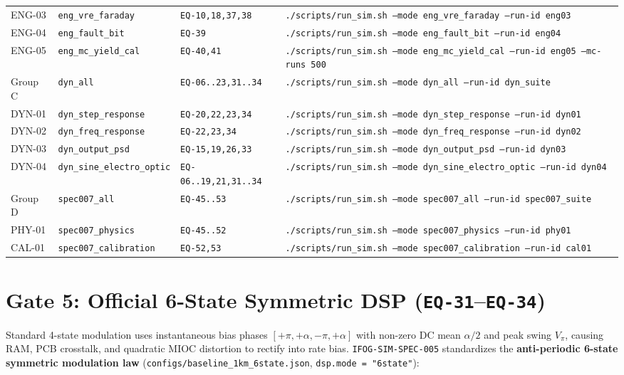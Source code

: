 \documentclass[11pt,a4paper]{article}
\begin{document}
\begin{tabularx}{\textwidth}{@{}l l l X@{}}
ENG-03 & \texttt{eng\_vre\_faraday} & \texttt{EQ-10,18,37,38} & \texttt{./scripts/run\_sim.sh --mode eng\_vre\_faraday --run-id eng03} \\
ENG-04 & \texttt{eng\_fault\_bit} & \texttt{EQ-39} & \texttt{./scripts/run\_sim.sh --mode eng\_fault\_bit --run-id eng04} \\
ENG-05 & \texttt{eng\_mc\_yield\_cal} & \texttt{EQ-40,41} & \texttt{./scripts/run\_sim.sh --mode eng\_mc\_yield\_cal --run-id eng05 --mc-runs 500} \\
Group C & \texttt{dyn\_all} & \texttt{EQ-06..23,31..34} & \texttt{./scripts/run\_sim.sh --mode dyn\_all --run-id dyn\_suite} \\
DYN-01 & \texttt{dyn\_step\_response} & \texttt{EQ-20,22,23,34} & \texttt{./scripts/run\_sim.sh --mode dyn\_step\_response --run-id dyn01} \\
DYN-02 & \texttt{dyn\_freq\_response} & \texttt{EQ-22,23,34} & \texttt{./scripts/run\_sim.sh --mode dyn\_freq\_response --run-id dyn02} \\
DYN-03 & \texttt{dyn\_output\_psd} & \texttt{EQ-15,19,26,33} & \texttt{./scripts/run\_sim.sh --mode dyn\_output\_psd --run-id dyn03} \\
DYN-04 & \texttt{dyn\_sine\_electro\_optic} & \texttt{EQ-06..19,21,31..34} & \texttt{./scripts/run\_sim.sh --mode dyn\_sine\_electro\_optic --run-id dyn04} \\
Group D & \texttt{spec007\_all} & \texttt{EQ-45..53} & \texttt{./scripts/run\_sim.sh --mode spec007\_all --run-id spec007\_suite} \\
PHY-01 & \texttt{spec007\_physics} & \texttt{EQ-45..52} & \texttt{./scripts/run\_sim.sh --mode spec007\_physics --run-id phy01} \\
CAL-01 & \texttt{spec007\_calibration} & \texttt{EQ-52,53} & \texttt{./scripts/run\_sim.sh --mode spec007\_calibration --run-id cal01} \\
\bottomrule
\end{tabularx}
\normalsize

\section{Gate 5: Official 6-State Symmetric DSP (\texttt{EQ-31}--\texttt{EQ-34})}

Standard 4-state modulation uses instantaneous bias phases $[+\pi, +\alpha, -\pi, +\alpha]$ with non-zero DC mean $\alpha/2$ and peak swing $V_\pi$, causing RAM, PCB crosstalk, and quadratic MIOC distortion to rectify into rate bias. \texttt{IFOG-SIM-SPEC-005} standardizes the \textbf{anti-periodic 6-state symmetric modulation law} (\texttt{configs/baseline\_1km\_6state.json}, \texttt{dsp.mode = "6state"}):
\end{document}
